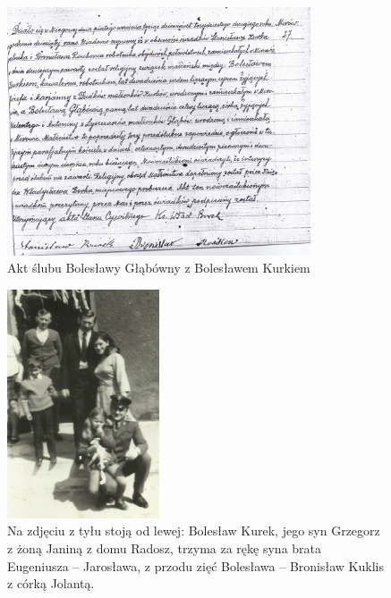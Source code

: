 \begin{figure}[!h]
\begin{center}
\includegraphics[width=0.8\textwidth]{zdjecia/akt_slubu_boleslawy_i_boleslawa_kurkow.jpg}
\caption{Akt ślubu Bolesławy Głąbówny z Bolesławem Kurkiem}
\label{rys:akt_slubu_boleslawy_i_boleslawa_kurkow}
\end{center}
\end{figure}

\begin{figure}[!h]
\begin{center}
\includegraphics[width=0.4\textwidth]{zdjecia/boleslaw_kurek_z_synem_i_zieciem.jpg}
\caption[Bolesław Kurek z synem, synową i zięciem]{Na zdjęciu z tyłu stoją od lewej: Bolesław Kurek, jego syn Grzegorz z żoną Janiną z domu Radosz, trzyma za rękę syna brata Eugeniusza -- Jarosława, z przodu zięć Bolesława -- Bronisław Kuklis z córką Jolantą.}
\label{rys:boleslaw_kurek_z_synem_i_zieciem}
\end{center}
\end{figure}

